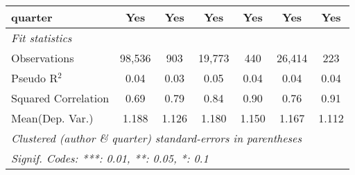 \begin{tabular}{lcccccc}
   quarter                                                    & Yes          & Yes           & Yes          & Yes            & Yes           & Yes\\  
   \midrule
   \emph{Fit statistics}\\
   Observations                                               & 98,536       & 903           & 19,773       & 440            & 26,414        & 223\\  
   Pseudo R$^2$                                               & 0.04         & 0.03          & 0.05         & 0.04           & 0.04          & 0.04\\  
   Squared Correlation                                        & 0.69         & 0.79          & 0.84         & 0.90           & 0.76          & 0.91\\  
Mean(Dep. Var.) & 1.188 & 1.126 & 1.180 & 1.150 & 1.167 & 1.112 \\
   \midrule \midrule
   \multicolumn{7}{l}{\emph{Clustered (author \& quarter) standard-errors in parentheses}}\\
   \multicolumn{7}{l}{\emph{Signif. Codes: ***: 0.01, **: 0.05, *: 0.1}}\\
\end{tabular}
\par\endgroup
